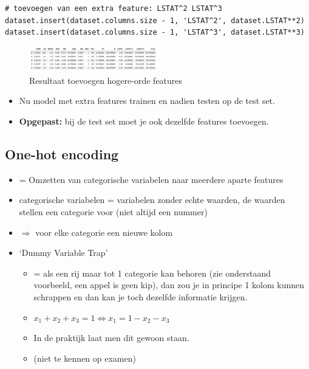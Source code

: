 \documentclass{article}
\begin{document}
\begin{figure}[H]
    \centering
\end{figure}

\begin{verbatim}
# toevoegen van een extra feature: LSTAT^2 LSTAT^3
dataset.insert(dataset.columns.size - 1, 'LSTAT^2', dataset.LSTAT**2)
dataset.insert(dataset.columns.size - 1, 'LSTAT^3', dataset.LSTAT**3)
\end{verbatim}

\begin{figure}[H]
    \centering
    \includegraphics[width=0.5\textwidth]{hogere-orde-features5.png}
    \caption{Resultaat toevoegen hogere-orde features}
\end{figure}

\begin{itemize}
    \item Nu model met extra features trainen en nadien testen op de test set.
    \item \textbf{Opgepast:} bij de test set moet je ook dezelfde features toevoegen.
\end{itemize}

\subsection{One-hot encoding}

\begin{itemize}
    \item = Omzetten van categorische variabelen naar meerdere aparte features
    \item categorische variabelen = variabelen zonder echte waarden, de waarden stellen een categorie voor (niet altijd een nummer)
    \item $\Rightarrow$ voor elke categorie een nieuwe kolom
    \item `Dummy Variable Trap'
    \begin{itemize}
        \item = als een rij maar tot 1 categorie kan behoren (zie onderstaand voorbeeld, een appel is geen kip), dan zou je in principe 1 kolom kunnen schrappen en dan kan je toch dezelfde informatie krijgen.
        \item $x_1 + x_2 + x_3 = 1 \Leftrightarrow x_1 = 1 - x_2 - x_3$   
        \item In de praktijk laat men dit gewoon staan.
        \item (niet te kennen op examen)
    \end{itemize}
\end{itemize}
\end{document}
